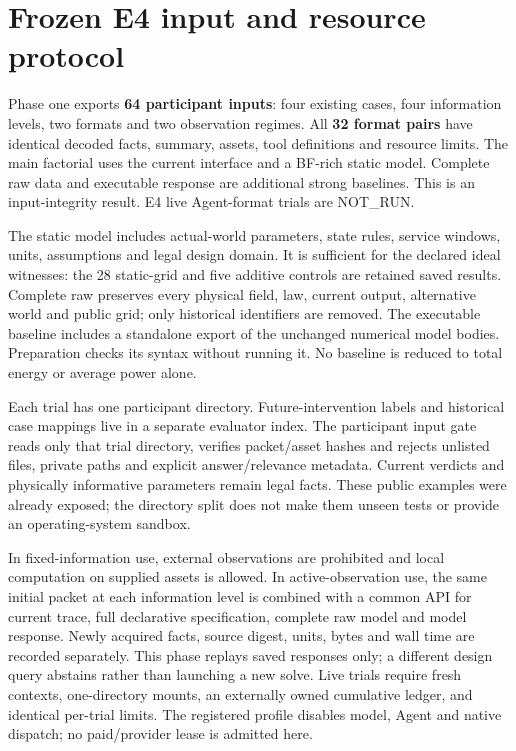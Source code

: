 \section{Frozen E4 input and resource protocol}
Phase one exports \textbf{64 participant inputs}: four existing cases,
four information levels, two formats and two observation regimes. All
\textbf{32 format pairs} have identical decoded facts, summary, assets, tool
definitions and resource limits. The main factorial uses the current interface
and a BF-rich static model. Complete raw data and executable response are
additional strong baselines. This is an input-integrity result. E4 live
Agent-format trials are NOT\_RUN.

The static model includes actual-world parameters, state rules, service windows,
units, assumptions and legal design domain. It is sufficient for the declared
ideal witnesses: the 28 static-grid and five additive controls are retained
saved results. Complete raw preserves every physical field, law, current output,
alternative world and public grid; only historical identifiers are removed.
The executable baseline includes a standalone export of the unchanged numerical
model bodies. Preparation checks its syntax without running it. No baseline is
reduced to total energy or average power alone.

Each trial has one participant directory. Future-intervention labels and
historical case mappings live in a separate evaluator index. The participant
input gate reads only that trial directory, verifies packet/asset hashes and
rejects unlisted files, private paths and explicit answer/relevance metadata.
Current verdicts and physically informative parameters remain legal facts.
These public examples were already exposed; the directory split does not make
them unseen tests or provide an operating-system sandbox.

In fixed-information use, external observations are prohibited and local
computation on supplied assets is allowed. In active-observation use, the same
initial packet at each information level is combined with a common API for
current trace, full declarative specification, complete raw model and model
response. Newly acquired facts, source digest, units, bytes and wall time are
recorded separately. This phase replays saved responses only; a different design
query abstains rather than launching a new solve. Live trials require fresh
contexts, one-directory mounts, an externally owned cumulative ledger, and
identical per-trial limits. The registered profile disables model, Agent and
native dispatch; no paid/provider lease is admitted here.

